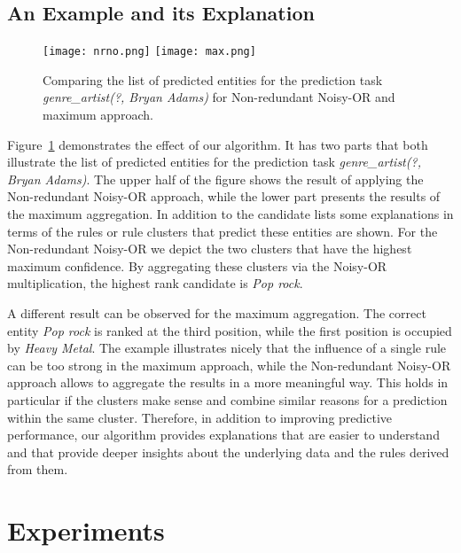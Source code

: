 \documentclass[akbc,twoside,11pt,lettersize]{article}
\begin{document}
\subsection{An Example and its Explanation}







\begin{figure}[htb]
\centering
\texttt{[image: nrno.png]}
\texttt{[image: max.png]}
\caption{Comparing the list of predicted entities for the prediction task \textit{genre\_artist(?, Bryan Adams)} for  Non-redundant Noisy-OR and maximum approach.}
\label{nrnomaxex}
\end{figure}

Figure~\ref{nrnomaxex} demonstrates the effect of our algorithm. It has two parts that both illustrate the list of predicted entities for the prediction task \textit{genre\_artist(?, Bryan Adams)}. The upper half of the figure shows the result of applying the Non-redundant Noisy-OR approach, while the lower part presents the results of the maximum aggregation. In addition to the candidate lists some explanations in terms of the rules or rule clusters that predict these entities are shown. For the Non-redundant Noisy-OR we depict the two clusters that have the highest maximum confidence. By aggregating these clusters via the Noisy-OR multiplication, the highest rank candidate is \textit{Pop rock}. 

A different result can be observed for the maximum aggregation. The correct entity \textit{Pop rock} is ranked at the third position, while the first position is occupied by \textit{Heavy Metal}. The example illustrates nicely that the influence of a single rule can be too strong in the maximum approach, while the Non-redundant Noisy-OR approach allows to aggregate the results in a more meaningful way. This holds in particular if the clusters make sense and combine similar reasons for a prediction within the same cluster. Therefore, in addition to improving predictive performance, our algorithm provides explanations that are easier to understand and that provide deeper insights about the underlying data and the rules derived from them.




\section{Experiments}
\end{document}
